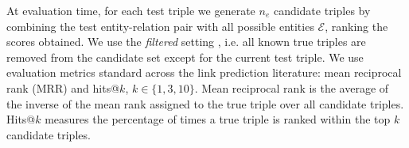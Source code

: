 \documentclass[11pt,a4paper]{article}
\begin{document}
At evaluation time, for each test triple we generate $n_e$ candidate triples by combining the test entity-relation pair with all possible entities $\mathcal{E}$, ranking the scores obtained. We use the \textit{filtered} setting \cite{bordes2013translating}, i.e. all known true triples are removed from the candidate set except for the current test triple. We use evaluation metrics standard across the link prediction literature: mean reciprocal rank (MRR) and hits@$k$, $k \in \{1, 3, 10\}$. Mean reciprocal rank is the average of the inverse of the mean rank assigned to the true triple over all candidate triples. Hits@$k$ measures the percentage of times a true triple is ranked within the top $k$ candidate triples.

\begin{table}[!htp]
    \centering
    \caption{Dataset statistics.}
    \vspace{-0.2cm}
     \label{datasets}
 \end{table}
\end{document}
